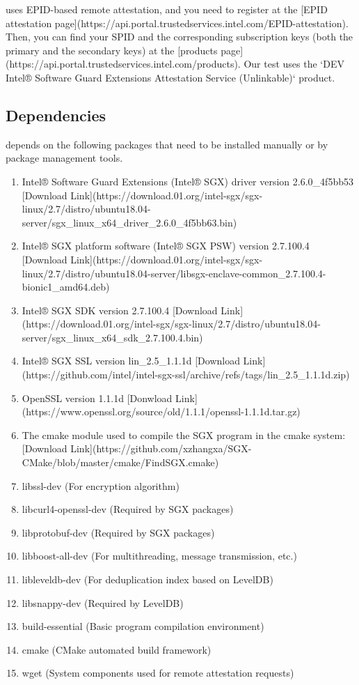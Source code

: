 \sysnameS uses EPID-based remote attestation, and you need to register at the [EPID attestation page](https://api.portal.trustedservices.intel.com/EPID-attestation). Then, you can find your SPID and the corresponding subscription keys (both the primary and the secondary keys) at the [products page](https://api.portal.trustedservices.intel.com/products). Our test uses the `DEV Intel® Software Guard Extensions Attestation Service (Unlinkable)` product.


\subsection{Dependencies}

\sysnameS depends on the following packages that  need to be installed manually or by package management tools.

\begin{enumerate}[leftmargin=*]
    \item Intel® Software Guard Extensions (Intel® SGX) driver version 2.6.0\_4f5bb53 [Download Link](https://download.01.org/intel-sgx/sgx-linux/2.7/distro/ubuntu18.04-server/sgx\_linux\_x64\_driver\_2.6.0\_4f5bb63.bin)
    \item Intel® SGX platform software (Intel® SGX PSW) version 2.7.100.4 [Download Link](https://download.01.org/intel-sgx/sgx-linux/2.7/distro/ubuntu18.04-server/libsgx-enclave-common\_2.7.100.4-bionic1\_amd64.deb)
    \item Intel® SGX SDK version 2.7.100.4 [Download Link](https://download.01.org/intel-sgx/sgx-linux/2.7/distro/ubuntu18.04-server/sgx\_linux\_x64\_sdk\_2.7.100.4.bin)
    \item Intel® SGX SSL version lin\_2.5\_1.1.1d [Download Link](https://github.com/intel/intel-sgx-ssl/archive/refs/tags/lin\_2.5\_1.1.1d.zip)
    \item OpenSSL version 1.1.1d [Donwload Link](https://www.openssl.org/source/old/1.1.1/openssl-1.1.1d.tar.gz)
    \item The cmake module used to compile the SGX program in the cmake system: [Download Link](https://github.com/xzhangxa/SGX-CMake/blob/master/cmake/FindSGX.cmake)
    \item libssl-dev (For \sysnameS encryption algorithm)
    \item libcurl4-openssl-dev (Required by SGX packages)
    \item libprotobuf-dev (Required by SGX packages)
    \item libboost-all-dev (For \sysnameS multithreading, message transmission, etc.)
    \item libleveldb-dev (For \sysnameS deduplication index based on LevelDB)
    \item libsnappy-dev (Required by LevelDB)
    \item build-essential (Basic program compilation environment)
    \item cmake (CMake automated build framework)
    \item wget (System components used for remote attestation requests)
    
\end{enumerate}


